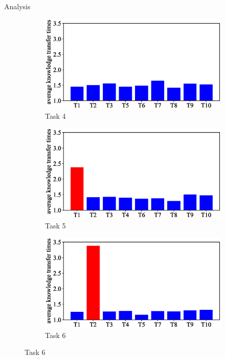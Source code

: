 \begin{frame}{Analysis}
\begin{figure}
        \begin{subfigure}[b]{0.27\linewidth}
            \includegraphics[width=\textwidth]{figure/count/4.eps}
            \caption{Task 4}
        \end{subfigure}
        \begin{subfigure}[b]{0.27\linewidth}
            \includegraphics[width=\textwidth]{figure/count/5.eps}
            \caption{Task 5}
        \end{subfigure}
        \begin{subfigure}[b]{0.27\linewidth}
            \includegraphics[width=\textwidth]{figure/count/6.eps}
            \caption{Task 6}
        \end{subfigure}


\end{figure}
\end{frame}
